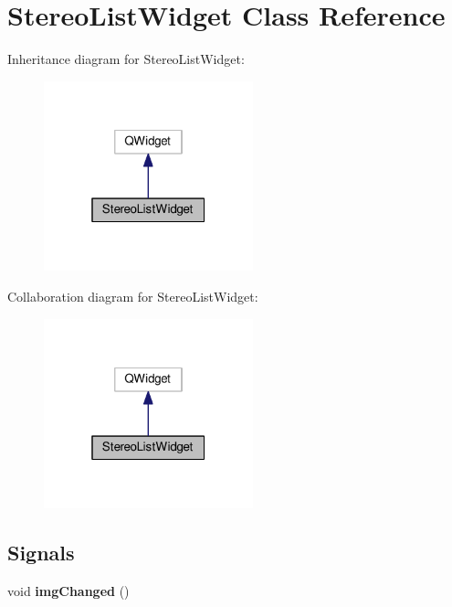 \hypertarget{classStereoListWidget}{}\section{Stereo\+List\+Widget Class Reference}
\label{classStereoListWidget}


Inheritance diagram for Stereo\+List\+Widget\+:\nopagebreak
\begin{figure}[H]
\begin{center}
\leavevmode
\includegraphics[width=172pt]{classStereoListWidget__inherit__graph}
\end{center}
\end{figure}


Collaboration diagram for Stereo\+List\+Widget\+:\nopagebreak
\begin{figure}[H]
\begin{center}
\leavevmode
\includegraphics[width=172pt]{classStereoListWidget__coll__graph}
\end{center}
\end{figure}
\subsection*{Signals}
\begin{DoxyCompactItemize}
\item 
void {\bfseries img\+Changed} ()\hypertarget{classStereoListWidget_a5f909d5acbcb8c0d105234e45219b94e}{}\label{classStereoListWidget_a5f909d5acbcb8c0d105234e45219b94e}

\end{DoxyCompactItemize}
